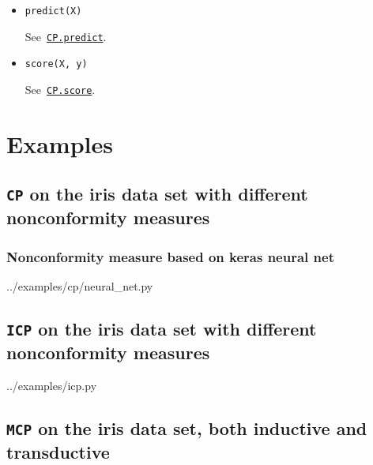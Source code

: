 \documentclass[twoside,11pt]{article}
\begin{document}
\begin{appendices}
\begin{itemize}
        \item
          \texttt{predict(X)}

          See~\hyperref[itm:cp_predict]
          {\texttt{CP.predict}}.
          \\

        \item
          \texttt{score(X, y)}

          See~\hyperref[itm:cp_score]
          {\texttt{CP.score}}.
          \\

      \end{itemize}

  \lstset{%
    basicstyle=\footnotesize,
    numbers = left,
    firstnumber = 0,
    stepnumber = 5,
    frame = single,
    breaklines = true,
  }

  \section{Examples}
  \label{appendix:b}

  \subsection{\texttt{CP} on the iris data set with
              different nonconformity measures}

  

  \subsubsection{Nonconformity measure based on keras
                 neural net}

  
  {../examples/cp/neural_net.py}

  \subsection{\texttt{ICP} on the iris data set with
              different nonconformity measures}

  
  {../examples/icp.py}

  \subsection{\texttt{MCP} on the iris data set, both
              inductive and transductive}


\end{appendices}
\end{document}
